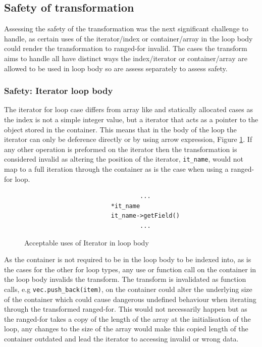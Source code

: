 \documentclass[bsc,frontabs,singlespacing,parskip,deptreport]{infthesis}
\begin{document}


\subsection{Safety of transformation}\label{sec:safety-of-trans}
Assessing the safety of the transformation was the next significant challenge to handle, as certain uses of the iterator/index or container/array in the loop body could render the transformation to ranged-for invalid. The cases the transform aims to handle all have distinct ways the index/iterator or container/array are allowed to be used in loop body so are assess separately to assess safety.

\subsubsection{Safety: Iterator loop body}\label{sec:safe-iter}
The iterator for loop case differs from array like and statically allocated cases as the index is not a simple integer value, but a iterator that acts as a pointer to the object stored in the container. This means that in the body of the loop the iterator can only be deference directly or by using arrow expression, Figure \ref{fig:code-iter-uses}. If any other operation is preformed on the iterator then the transformation is considered invalid as altering the position of the iterator, \texttt{it\_name}, would not map to a full iteration through the container as is the case when using a ranged-for loop. 

\begin{figure}[h]
    \centering
    \begin{verbatim}
                                ...
                        *it_name
                        it_name->getField()
                                ...
    \end{verbatim}
    \caption{Acceptable uses of Iterator in loop body}
    \label{fig:code-iter-uses}
\end{figure}

As the container is not required to be in the loop body to be indexed into, as is the cases for the other for loop types, any use or function call on the container in the loop body invalids the transform. The transform is invalidated as function calls, e.g \texttt{vec.push\_back(item)}, on the container could alter the underlying size of the container which could cause dangerous undefined behaviour when iterating through the transformed ranged-for. This would not necessarily happen but as the ranged-for takes a copy of the length of the array at the initialisation of the loop, any changes to the size of the array would make this copied length of the container outdated and lead the iterator to accessing invalid or wrong data. 
\end{document}
